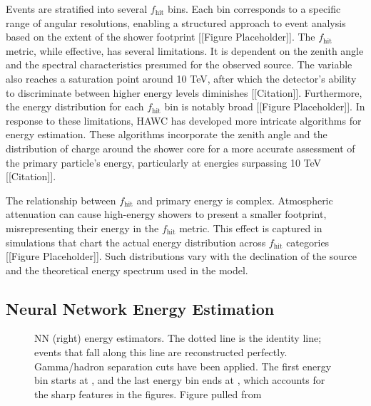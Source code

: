 Events are stratified into several $f_{\text{hit}}$ bins.
Each bin corresponds to a specific range of angular resolutions, enabling a structured approach to event analysis based on the extent of the shower footprint [[Figure Placeholder]].
The $f_{\text{hit}}$ metric, while effective, has several limitations.
It is dependent on the zenith angle and the spectral characteristics presumed for the observed source.
The variable also reaches a saturation point around 10 TeV, after which the detector's ability to discriminate between higher energy levels diminishes [[Citation]].
Furthermore, the energy distribution for each $f_{\text{hit}}$ bin is notably broad [[Figure Placeholder]].
In response to these limitations, HAWC has developed more intricate algorithms for energy estimation.
These algorithms incorporate the zenith angle and the distribution of charge around the shower core for a more accurate assessment of the primary particle's energy, particularly at energies surpassing 10 TeV [[Citation]].

The relationship between $f_{\text{hit}}$ and primary energy is complex.
Atmospheric attenuation can cause high-energy showers to present a smaller footprint, misrepresenting their energy in the $f_{\text{hit}}$ metric.
This effect is captured in simulations that chart the actual energy distribution across $f_{\text{hit}}$ categories [[Figure Placeholder]].
Such distributions vary with the declination of the source and the theoretical energy spectrum used in the model.

\subsection{Neural Network Energy Estimation}

\begin{figure}
    \caption{NN (right) energy estimators. The dotted line is the identity line; events that fall along this line are reconstructed perfectly. Gamma/hadron separation cuts have been applied. The first energy bin starts at , and the last energy bin ends at , which accounts for the sharp features in the figures. Figure pulled from \cite{100TEV_Crab_HAWC}}
    \label{fig:NN_performance}
\end{figure}

